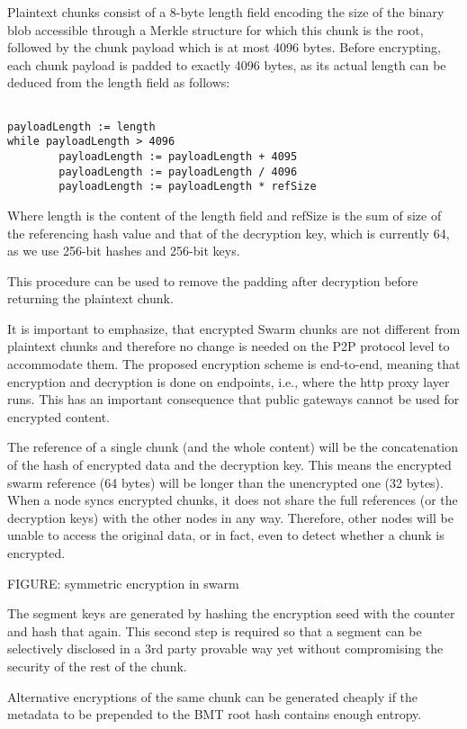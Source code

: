 
Plaintext chunks consist of a 8-byte length field encoding the size of the binary blob accessible through a Merkle structure for which this chunk is the root, followed by the chunk payload which is at most 4096 bytes. Before encrypting, each chunk payload is padded to exactly 4096 bytes, as its actual length can be deduced from the length field as follows:

\begin{verbatim}

payloadLength := length
while payloadLength > 4096
        payloadLength := payloadLength + 4095
        payloadLength := payloadLength / 4096
        payloadLength := payloadLength * refSize
\end{verbatim}

Where length is the content of the length field and refSize is the sum of size of the referencing hash value and that of the decryption key, which is currently 64, as we use 256-bit hashes and 256-bit keys.

This procedure can be used to remove the padding after decryption before returning the plaintext chunk. 


It is important to emphasize, that encrypted Swarm chunks are not different from plaintext chunks and therefore no change is needed on the P2P protocol level to accommodate them. The proposed encryption scheme is end-to-end, meaning that encryption and decryption is done on endpoints, i.e., where the http proxy layer runs. This has an important consequence that public gateways cannot be used for encrypted content.

The reference of a single chunk (and the whole content) will be the concatenation of the hash of encrypted data and the decryption key. This means the encrypted  swarm reference (64 bytes) will be longer than the unencrypted one (32 bytes). When a node syncs encrypted chunks, it does not share the full references (or the decryption keys) with the other nodes in any way.  Therefore, other nodes will be unable to access the original data, or in fact, even to detect whether a chunk is encrypted.
        

FIGURE: symmetric encryption in swarm 


The segment keys are generated by hashing the encryption seed with the counter and hash that again. This second step is required so that a segment can be selectively disclosed in a 3rd party provable way yet without compromising the security of the rest of the chunk.

Alternative encryptions of the same chunk can be generated cheaply if the metadata to be prepended to the BMT root hash contains enough entropy.
